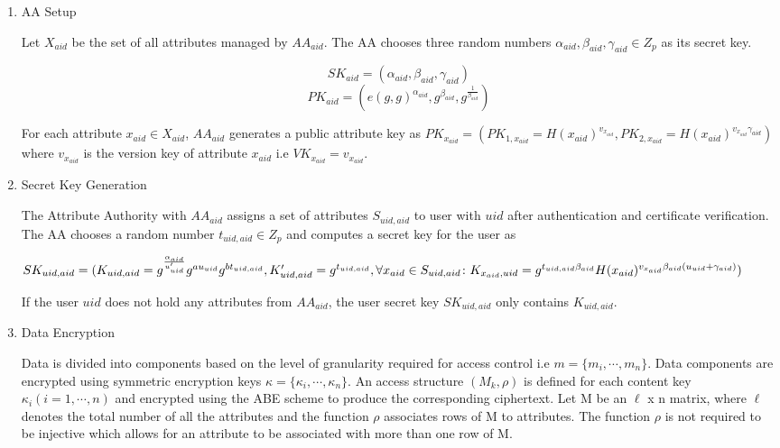 \begin{enumerate}
	\item AA Setup
	
	Let $ X_{aid} $ be the set of all attributes managed by $ AA_{aid} $. The AA chooses three random numbers $ \alpha_{aid}, \beta_{aid}, \gamma_{aid} \in Z_{p} $ as its secret key.
	
	$$ SK_{aid} = (\alpha_{aid}, \beta_{aid}, \gamma_{aid}) $$
	$$ PK_{aid} = (e(g, g)^{\alpha_{aid}}, g^{\beta_{aid}}, g^{\frac{1}{\beta_{aid}}}) $$
	
	For each attribute $ x_{aid} \in X_{aid} $, $ AA_{aid} $ generates a public attribute key as $ PK_{x_{aid}} = (PK_{1, x_{aid}} = H(x_{aid})^{v_{x_{aid}}}, PK_{2, x_{aid}} = H(x_{aid})^{v_{x_{aid}}\gamma_{aid}}) $ where $ v_{x_{aid}} $ is the version key of attribute $ x_{aid} $ i.e $ VK_{x_{aid}} = v_{x_{aid}} $.
	
	\item Secret Key Generation
	
	The Attribute Authority with $ AA_{aid} $ assigns a set of attributes $ S_{uid,aid} $ to user with $ uid $ after authentication and certificate verification. The AA chooses a random number $ t_{uid,aid} \in Z_{p} $ and computes a secret key for the user as
	
	$ SK_{uid,aid} = (K_{uid,aid} = g^{\frac{\alpha_{aid}}{u'_{uid}}}g^{au_{uid}}g^{bt_{uid,aid}}, K'_{uid,aid} = g^{t_{uid,aid}}, \\
	\forall x_{aid} \in S_{uid,aid} \colon K_{x_{aid},uid} = g^{t_{uid,aid}\beta_{aid}}H(x_{aid})^{v_{x_{aid}}\beta_{aid}(u_{uid} + \gamma_{aid})}) $
	
	If the user $ uid $ does not hold any attributes from $ AA_{aid} $, the user secret key $ SK_{uid,aid} $ only contains $ K_{uid,aid} $.
	
	\item Data Encryption
	
	Data is divided into components based on the level of granularity required for access control i.e $ m = \{m_{i}, \cdots, m_{n}\} $. Data components are encrypted using symmetric encryption keys $ \kappa = \{\kappa_{i}, \cdots, \kappa_{n}\} $. An access structure $ (M_{k}, \rho) $ is defined for each content key $ \kappa_{i} (i = 1, \cdots, n) $ and encrypted using the ABE scheme to produce the corresponding ciphertext. Let M be an $\ell$ x n matrix, where $\ell$ denotes the total number of all the attributes and the function $ \rho $ associates rows of M to attributes. The function $\rho$ is not required to be injective which allows for an attribute to be associated with more than one row of M.
	

\end{enumerate}
